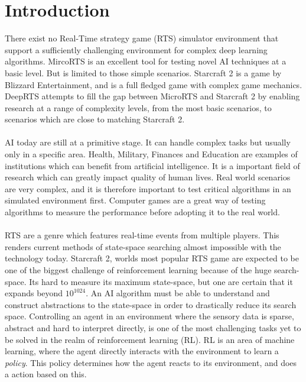 \documentclass[fleqn,10pt]{article} %
\begin{document}
\section{Introduction} %
There exist no Real-Time strategy game (RTS) simulator environment that support a sufficiently challenging environment for complex deep learning algorithms. MircoRTS is an excellent tool for testing novel AI techniques at a basic level. But is limited to those simple scenarios. Starcraft 2 is a game by Blizzard Entertainment, and is a full fledged game with complex game mechanics. DeepRTS attempts to fill the gap between MicroRTS and Starcraft 2 by enabling research at a range of complexity levels, from the most basic scenarios, to scenarios which are close to matching Starcraft 2.
\\
\\
AI today are still at a primitive stage. It can handle complex tasks but usually only in a specific area. Health, Military, Finances and Education are examples of institutions which can benefit from artificial intelligence. It is a important field of research which can greatly impact quality of human lives. Real world scenarios are very complex, and it is therefore important to test critical algorithms in an simulated environment first. Computer games are a great way of testing algorithms to measure the performance before adopting it to the real world.
\\
\\
RTS are a genre which features real-time events from multiple players. This renders current methods of state-space searching almost impossible with the technology today. Starcraft 2, worlds most popular RTS game are expected to be one of the biggest challenge of reinforcement learning because of the huge search-space. Its hard to measure its maximum state-space, but one are certain that it expands beyond $10^{1024}$. An AI algorithm must be able to understand and construct abstractions to the state-space in order to drastically reduce its search space.
Controlling an agent in an environment where the sensory data is sparse, abstract and hard to interpret directly, is one of the most challenging tasks yet to be solved in the realm of reinforcement learning (RL). RL is an area of machine learning, where the agent directly interacts  with the environment to learn a \textit{policy}. This policy determines how the agent reacts to its environment, and does a action based on this.
\end{document}

